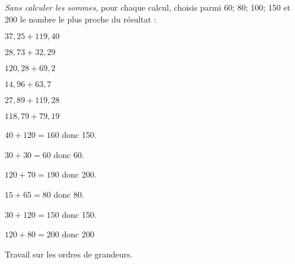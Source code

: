 {\em Sans calculer les sommes}, pour chaque calcul, choisis parmi 60; 80;
100; 150 et 200 le nombre le plus proche du résultat :
\begin{multicols}{3}
\begin{myenumerate}
\item $37,25+119,40$
\item $28,73+32,29$
\item $120,28+69,2$
\item $14,96+63,7$
\item $27,89+119,28$
\item $118,79+79,19$
\end{myenumerate}
\end{multicols}
\begin{multicols}{3}
  \begin{myenumerate}
    \item $40+120=160$ donc 150.
    \item $30+30=60$ donc 60.
    \item $120+70=190$ donc 200.
    \item $15+65=80$ donc 80.
    \item $30+120=150$ donc 150.
    \item $120+80=200$ donc 200
  \end{myenumerate}
\end{multicols}
Travail sur les ordres de grandeurs.